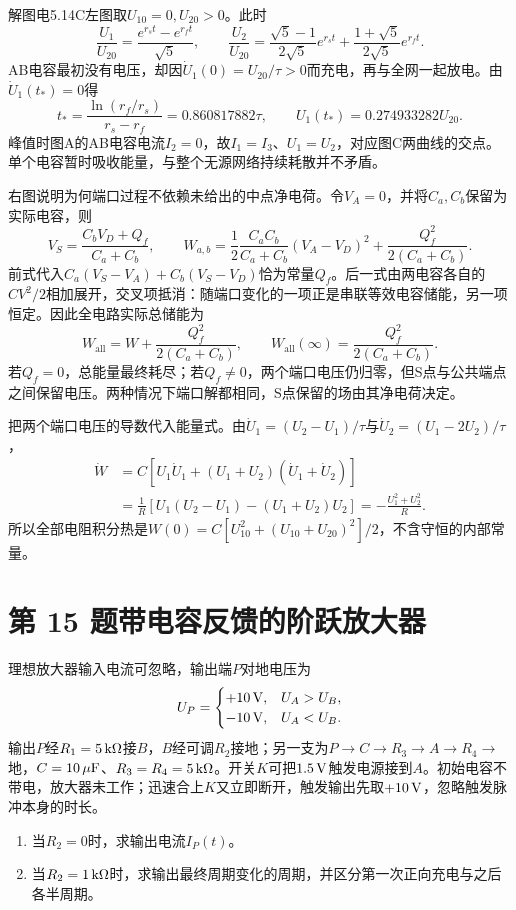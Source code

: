 \documentclass[UTF8,fontset=fandol,a4paper,11pt]{ctexart}
\begin{document}
解图电5.14C左图取$U_{10}=0,U_{20}>0$。此时
\[
\frac{U_1}{U_{20}}=\frac{e^{r_st}-e^{r_ft}}{\sqrt5},\qquad
\frac{U_2}{U_{20}}=\frac{\sqrt5-1}{2\sqrt5}e^{r_st}
+\frac{1+\sqrt5}{2\sqrt5}e^{r_ft}.
\]
AB电容最初没有电压，却因$\dot U_1(0)=U_{20}/\tau>0$而充电，再与全网一起放电。由$\dot U_1(t_*)=0$得
\[
t_* =\frac{\ln(r_f/r_s)}{r_s-r_f}=0.860817882\tau,\qquad
U_1(t_*)=0.274933282U_{20}.
\]
峰值时图A的AB电容电流$I_2=0$，故$I_1=I_3$、$U_1=U_2$，对应图C两曲线的交点。单个电容暂时吸收能量，与整个无源网络持续耗散并不矛盾。

右图说明为何端口过程不依赖未给出的中点净电荷。令$V_A=0$，并将$C_a,C_b$保留为实际电容，则
\[
V_S=\frac{C_bV_D+Q_f}{C_a+C_b},\qquad
W_{a,b}=\frac12\frac{C_aC_b}{C_a+C_b}(V_A-V_D)^2
+\frac{Q_f^2}{2(C_a+C_b)}.
\]
前式代入$C_a(V_S-V_A)+C_b(V_S-V_D)$恰为常量$Q_f$。后一式由两电容各自的$CV^2/2$相加展开，交叉项抵消：随端口变化的一项正是串联等效电容储能，另一项恒定。因此全电路实际总储能为
\[
W_{\mathrm{all}}=W+\frac{Q_f^2}{2(C_a+C_b)},\qquad
W_{\mathrm{all}}(\infty)=\frac{Q_f^2}{2(C_a+C_b)}.
\]
若$Q_f=0$，总能量最终耗尽；若$Q_f\ne0$，两个端口电压仍归零，但S点与公共端点之间保留电压。两种情况下端口解都相同，S点保留的场由其净电荷决定。

把两个端口电压的导数代入能量式。由$\dot U_1=(U_2-U_1)/\tau$与$\dot U_2=(U_1-2U_2)/\tau$，
\[
\begin{aligned}
\dot W&=C[U_1\dot U_1+(U_1+U_2)(\dot U_1+\dot U_2)]\\
&=\frac1R[U_1(U_2-U_1)-(U_1+U_2)U_2]
=-\frac{U_1^2+U_2^2}{R}.
\end{aligned}
\]
所以全部电阻积分热是$W(0)=C[U_{10}^2+(U_{10}+U_{20})^2]/2$，不含守恒的内部常量。




\section*{第 15 题\quad 带电容反馈的阶跃放大器}\label{q:15}


理想放大器输入电流可忽略，输出端$P$对地电压为
\[
 U_P=\begin{cases}+10\,{\rm V},&U_A>U_B,\\-10\,{\rm V},&U_A<U_B.\end{cases}
\]
输出$P$经$R_1=5\,{\rm k}\Omega$接$B$，$B$经可调$R_2$接地；另一支为$P\to C\to R_3\to A\to R_4\to$地，$C=10\,\mu{\rm F}$、$R_3=R_4=5\,{\rm k}\Omega$。开关$K$可把$1.5\,{\rm V}$触发电源接到$A$。初始电容不带电，放大器未工作；迅速合上$K$又立即断开，触发输出先取$+10\,{\rm V}$，忽略触发脉冲本身的时长。
\begin{enumerate}
\item 当$R_2=0$时，求输出电流$I_P(t)$。
\item 当$R_2=1\,{\rm k}\Omega$时，求输出最终周期变化的周期，并区分第一次正向充电与之后各半周期。
\end{enumerate}
\end{document}
